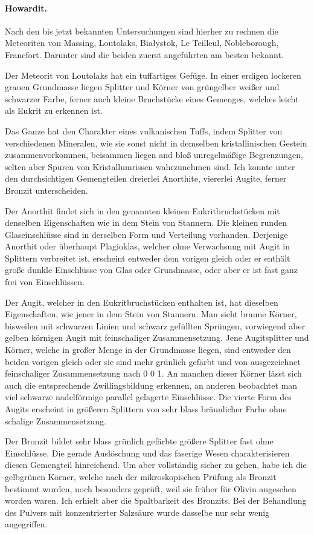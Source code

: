 \documentclass[a4paper, 12pt, oneside]{article}
\begin{document}
\paragraph{Howardit.} Nach den bis jetzt bekannten Untersuchungen sind hierher zu rechnen die Meteoriten von Massing, Loutolaks, Białystok, Le Teilleul, Nobleborough, Francfort. Darunter sind die beiden zuerst angeführten am besten bekannt.

Der Meteorit von Loutolaks hat ein tuffartiges Gefüge. In einer erdigen lockeren grauen Grundmasse liegen Splitter und Körner von grüngelber weißer und schwarzer Farbe, ferner auch kleine Bruchstücke eines Gemenges, welches leicht als Eukrit zu erkennen ist.

Das Ganze hat den Charakter eines vulkanischen Tuffs, indem Splitter von verschiedenen Mineralen, wie sie sonst nicht in demselben kristallinischen Gestein zusammenvorkommen, beisammen liegen and bloß unregelmäßige Begrenzungen, selten aber Spuren von Kristallumrissen wahrzunehmen sind. Ich konnte unter den durchsichtigen Gemengteilen dreierlei Anorthite, viererlei Augite, ferner Bronzit unterscheiden.

Der Anorthit findet sich in den genannten kleinen Eukritbruchstücken mit denselben Eigenschaften wie in dem Stein von Stannern. Die kleinen runden Glaseinschlüsse sind in derselben Form und Verteilung vorhanden. Derjenige Anorthit oder überhaupt Plagioklas, welcher ohne Verwachsung mit Augit in Splittern verbreitet ist, erscheint entweder dem vorigen gleich oder er enthält große dunkle Einschlüsse von Glas oder Grundmasse, oder aber er ist fast ganz frei von Einschlüssen.

Der Augit, welcher in den Eukritbruchstücken enthalten ist, hat dieselben Eigenschaften, wie jener in dem Stein von Stannern. Man sieht braune Körner, bisweilen mit schwarzen Linien und schwarz gefüllten Sprüngen, vorwiegend aber gelben körnigen Augit mit feinschaliger Zusammensetzung. Jene Augitsplitter und Körner, welche in großer Menge in der Grundmasse liegen, sind entweder den beiden vorigen gleich oder sie sind mehr grünlich gefärbt und von ausgezeichnet feinschaliger Zusammensetzung nach 0 0 1. An manchen dieser Körner lässt sich auch die entsprechende Zwillingsbildung erkennen, an anderen beobachtet man viel schwarze nadelförmige parallel gelagerte Einschlüsse. Die vierte Form des Augits erscheint in größeren Splittern von sehr blass bräunlicher Farbe ohne schalige Zusammensetzung.

Der Bronzit bildet sehr blass grünlich gefärbte größere Splitter fast ohne Einschlüsse. Die gerade Auslöschung und das faserige Wesen charakterisieren diesen Gemengteil hinreichend. Um aber vollständig sicher zu gehen, habe ich die gelbgrünen Körner, welche nach der mikroskopischen Prüfung als Bronzit bestimmt wurden, noch besonders geprüft, weil sie früher für Olivin angesehen worden waren. Ich erhielt aber die Spaltbarkeit des Bronzits. Bei der Behandlung des Pulvers mit konzentrierter Salzsäure wurde dasselbe nur sehr wenig angegriffen.
\end{document}
